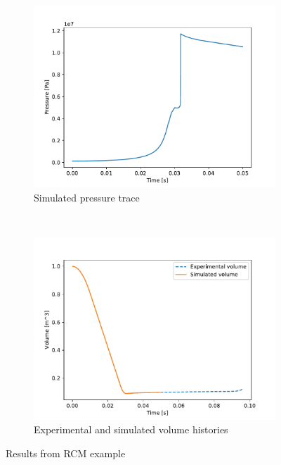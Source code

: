 \documentclass[12pt]{ijck}
\begin{document}
\begin{figure}[htbp]
    \centering
    \begin{subfigure}{0.7\textwidth}
        \centering
        \includegraphics[width=\linewidth]{rcm-pressure.pdf}
        \caption{Simulated pressure trace}
    \end{subfigure}
    \\
    \begin{subfigure}{0.7\textwidth}
        \centering
        \includegraphics[width=\linewidth]{rcm-volume.pdf}
        \caption{Experimental and simulated volume histories}
    \end{subfigure}
    \caption{Results from RCM example}
    \label{fig:rcm}
\end{figure}
\end{document}
